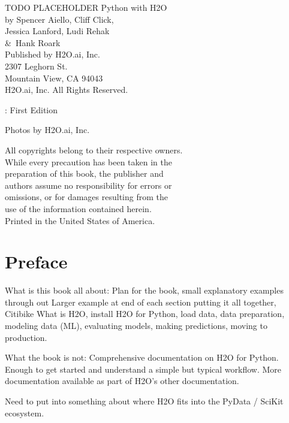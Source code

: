 {\raggedright 

TODO PLACEHOLDER Python with H2O\\

  by Spencer Aiello, Cliff Click, \\ 
Jessica Lanford, Ludi Rehak \\
\&\  Hank Roark\\
\bigskip
  Published by H2O.ai, Inc. \\
2307 Leghorn St. \\
Mountain View, CA 94043\\
\bigskip
\textcopyright \the\year \hspace{1pt} H2O.ai, Inc. All Rights Reserved. 
\bigskip

\monthname \hspace{1pt}  \the\year: First Edition 
\bigskip

Photos by \textcopyright H2O.ai, Inc.
\bigskip

All copyrights belong to their respective owners.\\
While every precaution has been taken in the\\
preparation of this book, the publisher and\\
authors assume no responsibility for errors or\\
omissions, or for damages resulting from the\\
use of the information contained herein.\\
\bigskip
Printed in the United States of America. 
}


\newpage
\thispagestyle{empty}%

\tableofcontents


\newpage

\section{Preface}
What is this book all about:
Plan for the book, small explanatory examples through out
Larger example at end of each section putting it all together, Citibike
What is H2O, install H2O for Python, load data, data preparation,
modeling data (ML), evaluating models, making predictions, moving to production.

What the book is not:
Comprehensive documentation on H2O for Python.  Enough to get started and understand
a simple but typical workflow.  More documentation available as part of H2O's
other documentation.


Need to put into something about where H2O fits into the PyData / SciKit ecosystem.

